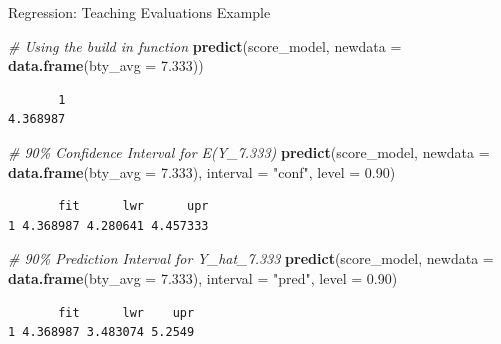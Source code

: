 \documentclass[
  ignorenonframetext,
]{beamer}
\newenvironment{Shaded}{\begin{snugshade}}{\end{snugshade}}
\newcommand{\AttributeTok}[1]{\textcolor[rgb]{0.13,0.29,0.53}{#1}}
\newcommand{\CommentTok}[1]{\textcolor[rgb]{0.56,0.35,0.01}{\textit{#1}}}
\newcommand{\FloatTok}[1]{\textcolor[rgb]{0.00,0.00,0.81}{#1}}
\newcommand{\FunctionTok}[1]{\textcolor[rgb]{0.13,0.29,0.53}{\textbf{#1}}}
\newcommand{\NormalTok}[1]{#1}
\newcommand{\StringTok}[1]{\textcolor[rgb]{0.31,0.60,0.02}{#1}}
\begin{document}
\begin{frame}[fragile]{Regression: Teaching Evaluations Example}
\protect\hypertarget{regression-teaching-evaluations-example-17}{}
\normalsize

\begin{Shaded}
\begin{Highlighting}[]
\CommentTok{\# Using the build in function}
\FunctionTok{predict}\NormalTok{(score\_model, }\AttributeTok{newdata =} \FunctionTok{data.frame}\NormalTok{(}\AttributeTok{bty\_avg =} \FloatTok{7.333}\NormalTok{))}
\end{Highlighting}
\end{Shaded}

\begin{verbatim}
       1 
4.368987 
\end{verbatim}

\begin{Shaded}
\begin{Highlighting}[]
\CommentTok{\# 90\% Confidence Interval for E(Y\_7.333)}
\FunctionTok{predict}\NormalTok{(score\_model, }\AttributeTok{newdata =} \FunctionTok{data.frame}\NormalTok{(}\AttributeTok{bty\_avg =} \FloatTok{7.333}\NormalTok{), }
        \AttributeTok{interval =} \StringTok{"conf"}\NormalTok{, }\AttributeTok{level =} \FloatTok{0.90}\NormalTok{)}
\end{Highlighting}
\end{Shaded}

\begin{verbatim}
       fit      lwr      upr
1 4.368987 4.280641 4.457333
\end{verbatim}

\begin{Shaded}
\begin{Highlighting}[]
\CommentTok{\# 90\% Prediction Interval for Y\_hat\_7.333}
\FunctionTok{predict}\NormalTok{(score\_model, }\AttributeTok{newdata =} \FunctionTok{data.frame}\NormalTok{(}\AttributeTok{bty\_avg =} \FloatTok{7.333}\NormalTok{), }
        \AttributeTok{interval =} \StringTok{"pred"}\NormalTok{, }\AttributeTok{level =} \FloatTok{0.90}\NormalTok{)}
\end{Highlighting}
\end{Shaded}

\begin{verbatim}
       fit      lwr    upr
1 4.368987 3.483074 5.2549
\end{verbatim}

\normalsize
\end{frame}
\end{document}
